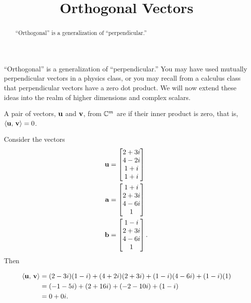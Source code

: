 \documentclass{ximera}
\title{Orthogonal Vectors}
\begin{document}
\begin{abstract}
``Orthogonal'' is a generalization of ``perpendicular.''
\end{abstract}
\maketitle

``Orthogonal'' is a generalization of ``perpendicular.''  You may have
used mutually perpendicular vectors in a physics class, or you may
recall from a calculus class that perpendicular vectors have a zero
dot product.  We will now extend these ideas into the realm of higher
dimensions and complex scalars.

\begin{definition}
  A pair of vectors, $\mathbf{u}$ and $\mathbf{v}$, from $\mathbb{C}^{m}$ are
   if their inner product is zero, that is,
  $\left\langle\mathbf{u},\,\mathbf{v}\right\rangle=0$.
\end{definition}

\begin{example}
  Consider the vectors
  \begin{align*}
    \mathbf{u}&=\begin{bmatrix}2 + 3i\\4 - 2i\\1 + i\\1 + i\end{bmatrix} \\
    \mathbf{a}&=\begin{bmatrix}1 + i\\2 + 3i\\4 - 6i\\1\end{bmatrix} \\
    \mathbf{b}&=\begin{bmatrix}1 - i\\2 + 3i\\4 - 6i\\1\end{bmatrix}.
  \end{align*}
  Then
  \begin{multipleChoice}
  \end{multipleChoice}
  
  \begin{hint}
    \begin{align*}
      \left\langle\mathbf{u},\,\mathbf{v}\right\rangle
      &=(2-3i)(1-i)+(4+2i)(2+3i)+(1-i)(4-6i)+(1-i)(1)\\
      &=(-1-5i)+(2+16i)+(-2-10i)+(1-i)\\
      &=0+0i.
    \end{align*}
  \end{hint}
\end{example}
\end{document}
